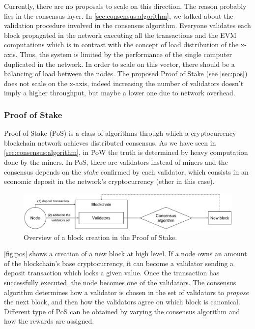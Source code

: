 Currently, there are no proposals to scale on this direction. The reason
probably lies in the consensus layer. In \autoref{sec:consensus:algorithm}, we
talked about the validation procedure involved in the consensus algorithm.
Everyone validates each block propagated in the network executing all the
transactions and the EVM computations which is in contrast with the concept of
load distribution of the x-axis. Thus, the system is limited by the performance
of the single computer duplicated in the network. In order to scale on this
vector, there should be a balancing of load between the nodes. The proposed
Proof of Stake (see \autoref{sec:pos}) does not scale on the
x-axis, indeed increasing the number of validators doesn't imply a higher
throughput, but maybe a lower one due to network
overhead\cite{bib:cbc-casper}.

\subsubsection{Proof of Stake}
\label{sec:pos}
Proof of Stake (PoS) is a class of algorithms through which a cryptocurrency
blockchain network achieves distributed consensus. As we have seen in
\autoref{sec:consensus:algorithm}, in PoW the truth is determined by heavy
computation done by the miners. In PoS, there are validators instead of miners
and the consensus depends on the \emph{stake} confirmed by each validator, which
consists in an economic deposit in the network's cryptocurrency (ether in this
case).

\begin{figure}
	\begin{center}
		\includegraphics[width=\textwidth]{./res/img/pos.pdf}
	\end{center}
	\caption{Overview of a block creation in the Proof of Stake.}
	\label{fig:pos}
\end{figure}

\autoref{fig:pos} shows a creation of a new block at high level. If a node owns
an amount of the blockchain's base cryptocurrency, it can become a validator
sending a deposit transaction which locks a given value. Once the transaction
has successfully executed, the node becomes one of the validators. The consensus
algorithm determines how a validator is chosen in the set of validators to
\emph{propose} the next block, and then how the validators agree on which block
is canonical. Different type of PoS can be obtained by varying the consensus
algorithm and how the rewards are assigned.